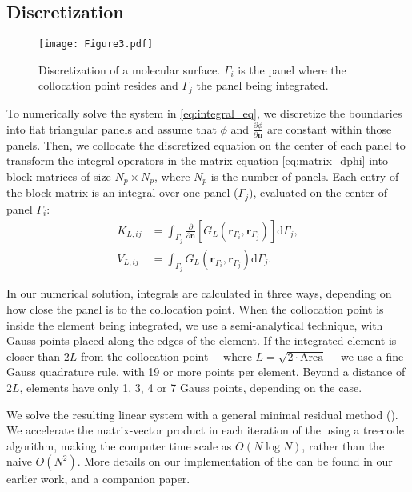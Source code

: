 

\subsection{Discretization}

 \begin{figure}[b]
   \centering
   \texttt{[image: Figure3.pdf]} 
   \caption{Discretization of a molecular surface. $\Gamma_i$ is the panel where the collocation point resides and $\Gamma_j$ the panel being integrated.}
   \label{fig:molecule_disc}
\end{figure}

To numerically solve the system in \eqref{eq:integral_eq}, we discretize the boundaries into flat triangular panels and assume that $\phi$ and $\frac{\partial \phi}{\partial \mathbf{n}}$ are constant within those panels. Then, we collocate the discretized equation on the center of each panel to transform the integral operators in the matrix equation \eqref{eq:matrix_dphi} into block matrices of size $N_p \times N_p$, where $N_p$ is the number of panels. Each entry of the block matrix is an integral over one panel ($\Gamma_j$), evaluated on the center of panel $\Gamma_i$:
%
\begin{align} \label{eq:layers_element}
K_{L,ij} &= \int_{\Gamma_j} \frac{\partial}{\partial \mathbf{n}} \left[ G_L(\mathbf{r}_{\Gamma_i},\mathbf{r}_{\Gamma_j}) \right]\mathrm{d} \Gamma_j, \nonumber \\
V_{L,ij} &= \int_{\Gamma_j} G_L(\mathbf{r}_{\Gamma_i},\mathbf{r}_{\Gamma_j})  \mathrm{d} \Gamma_j.
\end{align}

In our numerical solution, integrals are calculated in three ways, depending on how close the panel is to the collocation point. When the collocation point is inside the element being integrated, we use a semi-analytical technique, \cite{ZhuHuangSongWhite2001} with Gauss points placed along the edges of the element. If the integrated element is closer than $2L$ from the collocation point ---where $L = \sqrt{2\cdot \text{Area}}$--- we use a fine Gauss quadrature rule, with 19 or more points per element. Beyond a distance of $2L$, elements have only 1, 3, 4 or 7 Gauss points, depending on the case.

We solve the resulting linear system with a general minimal residual method (\gmres). We accelerate the matrix-vector product in each iteration of the \gmres using a treecode algorithm, making the computer time scale as $O(N\log N)$, rather than the naive $O(N^2)$. More details on our implementation of the \bem can be found in our earlier work,\cite{CooperBarba-share154331} and a companion paper.\cite{CooperBarba2015a}
